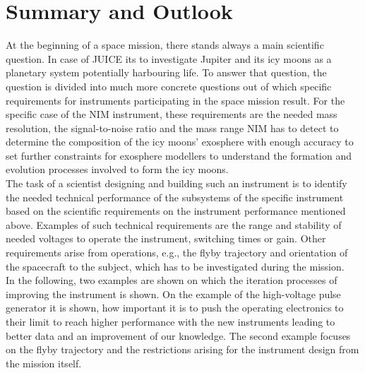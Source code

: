 \section{Summary and Outlook}
	
	At the beginning of a space mission, there stands always a main scientific question. In case of JUICE its to investigate Jupiter and its icy moons as a planetary system potentially harbouring life. To answer that question, the question is divided into much more concrete questions out of which specific requirements for instruments participating in the space mission result. For the specific case of the NIM instrument, these requirements are the needed mass resolution, the signal-to-noise ratio and the mass range NIM has to detect to determine the composition of the icy moons' exosphere with enough accuracy to set further constraints for exosphere modellers to understand the formation and evolution processes involved to form the icy moons.\\
	The task of a scientist designing and building such an instrument is to identify the needed technical performance of the subsystems of the specific instrument based on the scientific requirements on the instrument performance mentioned above. Examples of such technical requirements are the range and stability of needed voltages to operate the instrument, switching times or gain. Other requirements arise from operations, e.g., the flyby trajectory and orientation of the spacecraft to the subject, which has to be investigated during the mission.\\
	In the following, two examples are shown on which the iteration processes of improving the instrument is shown. On the example of the high-voltage pulse generator it is shown, how important it is to push the operating electronics to their limit to reach higher performance with the new instruments leading to better data and an improvement of our knowledge. The second example focuses on the flyby trajectory and the restrictions arising for the instrument design from the mission itself.\\
	
